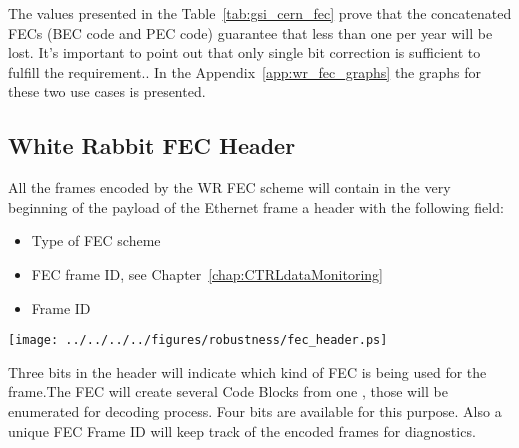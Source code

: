 The values presented in the Table~\ref{tab:gsi_cern_fec} prove that the
concatenated FECs (BEC code and PEC code) guarantee that less than one
\ControlMessage per year will be lost. It's important to point out that only
single bit correction is sufficient to fulfill the requirement..
In the Appendix~\ref{app:wr_fec_graphs} the graphs for these two use
cases is presented.

\subsection{White Rabbit FEC Header}

All the frames encoded by the WR FEC scheme will contain in the very beginning
of the payload of the Ethernet frame a header with the following field:

\begin{itemize}
	\item Type of FEC scheme
	\item FEC frame ID, see Chapter~\ref{chap:CTRLdataMonitoring}
	\item Frame ID
\end{itemize}

\begin{center}
        \texttt{[image: ../../../../figures/robustness/fec\_header.ps]}
         \label{fig:fec_header}
\end{center}

Three bits in the header will indicate which kind of FEC is being used for the
frame.The FEC will create several Code Blocks from one \ControlMessage, those
will be enumerated for decoding process. Four bits are available for this
purpose. Also a unique FEC Frame ID will keep track of the encoded frames for
diagnostics.






